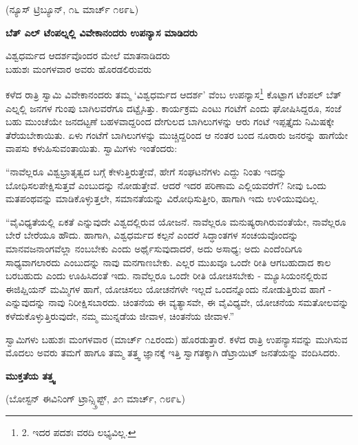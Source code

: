 \begin{center}
(ನ್ಯೂಸ್ ಟ್ರಿಬ್ಯೂನ್, ೧೬ ಮಾರ್ಚ್ ೧೮೯೬)
\end{center}

\begin{center}
\textbf{ಬೆತ್ ಎಲ್ ಟೆಂಪಲ್ನಲ್ಲಿ ವಿವೇಕಾನಂದರು ಉಪನ್ಯಾಸ ಮಾಡಿದರು}
\end{center}

\begin{myquote}
ವಿಶ್ವಧರ್ಮದ ಆದರ್ಶವೊಂದರ ಮೇಲೆ ಮಾತನಾಡಿದರು\\ಬಹುಶಃ ಮಂಗಳವಾರ ಅವರು ಹೊರಡಲಿರುವರು
\end{myquote}

ಕಳೆದ ರಾತ್ರಿ ಸ್ವಾಮಿ ವಿವೇಕಾನಂದರು ತಮ್ಮ ‘ವಿಶ್ವಧರ್ಮದ ಆದರ್ಶ’ ವೆಂಬ ಉಪನ್ಯಾಸ\footnote{2. ಇದರ ಪದಶಃ ವರದಿ ಲಭ್ಯವಿಲ್ಲ.} ಕೊಟ್ಟಾಗ ಟೆಂಪಲ್ ಬೆತ್ ಎಲ್ನಲ್ಲಿ ಜನಗಳ ಗುಂಪು ಬಾಗಿಲವರೆಗೂ ದಟ್ಟೈಸಿತ್ತು. ಕಾರ್ಯಕ್ರಮ ಎಂಟು ಗಂಟೆಗೆ ಎಂದು ಘೋಷಿಸಿದ್ದರೂ, ಸಂಜೆ ಬಹು ಮುಂಚೆಯೇ ಜನದಟ್ಟಣೆ ಬಹಳವಾದ್ದರಿಂದ ದೇಗುಲದ ಬಾಗಿಲುಗಳನ್ನು ಆರು ಗಂಟೆ ಇಪ್ಪತ್ತೈದು ನಿಮಿಷಕ್ಕೇ ತೆರೆಯಬೇಕಾಯಿತು. ಏಳು ಗಂಟೆಗೆ ಬಾಗಿಲುಗಳನ್ನು ಮುಚ್ಚಿದ್ದರಿಂದ ಆ ನಂತರ ಬಂದ ನೂರಾರು ಜನರನ್ನು ಹಾಗೆಯೇ ವಾಪಸು ಕಳುಹಿಸುವಂತಾಯಿತು. ಸ್ವಾಮಿಗಳು ಇಂತೆಂದರು:

“ನಾವೆಲ್ಲರೂ ವಿಶ್ವಭ್ರಾತೃತ್ವದ ಬಗ್ಗೆ ಕೇಳುತ್ತಿರುತ್ತೇವೆ, ಹೇಗೆ ಸಂಘಟನೆಗಳು ಎದ್ದು ನಿಂತು ಇದನ್ನು ಬೋಧಿಸಲಪೇಕ್ಷಿಸುತ್ತವೆ ಎಂಬುದನ್ನು ನೋಡುತ್ತೇವೆ. ಆದರೆ ಇದರ ಪರಿಣಾಮ ಎಲ್ಲಿಯವರೆಗೆ? ನೀವು ಒಂದು ಮತಪಂಥವನ್ನು ಮಾಡಿಕೊಳ್ಳುತ್ತಲೇ, ಸಮಾನತೆಯನ್ನು ವಿರೋಧಿಸುತ್ತೀರಿ, ಹಾಗಾಗಿ ಇದು ಉಳಿಯುವುದಿಲ್ಲ.

“ವೈವಿಧ್ಯತೆಯಲ್ಲಿ ಏಕತೆ ಎನ್ನುವುದೇ ವಿಶ್ವದಲ್ಲಿರುವ ಯೋಜನೆ. ನಾವೆಲ್ಲರೂ ಮನುಷ್ಯರಾಗಿರುವಂತೆಯೇ, ನಾವೆಲ್ಲರೂ ಬೇರೆ ಬೇರೆಯೂ ಹೌದು. ಹಾಗಾಗಿ, ವಿಶ್ವಧರ್ಮದ ಕಲ್ಪನೆ ಎಂದರೆ ಸಿದ್ಧಾಂತಗಳ ಸಂಚಯವೊಂದನ್ನು ಮಾನವಜನಾಂಗವೆಲ್ಲಾ ನಂಬಬೇಕು ಎಂದು ಅರ್ಥೈಸುವುದಾದರೆ, ಅದು ಅಸಾಧ್ಯ; ಅದು ಎಂದೆಂದಿಗೂ ಸಾಧ್ಯವಾಗಲಾರದು ಎಂಬುದನ್ನು ನಾವು ಮನಗಾಣಬೇಕು. ಎಲ್ಲರ ಮುಖವೂ ಒಂದೇ ರೀತಿ ಆಗಬಹುದಾದ ಕಾಲ ಬರಬಹುದು ಎಂದು ಊಹಿಸಿದಂತೆ ಇದು. ನಾವೆಲ್ಲರೂ ಒಂದೇ ರೀತಿ ಯೋಚಿಸಬೇಕು - ಮ್ಯೂಸಿಯಂನಲ್ಲಿರುವ ಈಜಿಪ್ಷಿಯನ್ ಮಮ್ಮಿಗಳ ಹಾಗೆ, ಯೋಚಿಸಲು ಯೋಚನೆಗಳೇ ಇಲ್ಲದೆ ಒಂದನ್ನೊಂದು ನೋಡುತ್ತಿರುವ ಹಾಗೆ - ಎನ್ನುವುದನ್ನು ನಾವು ನಿರೀಕ್ಷಿಸಬಾರದು. ಚಿಂತನೆಯ ಈ ವ್ಯತ್ಯಾಸವೇ, ಈ ವೈವಿಧ್ಯವೇ, ಯೋಚನೆಯ ಸಮತೋಲವನ್ನು ಕಳೆದುಕೊಳ್ಳುತ್ತಿರುವುದೇ, ನಮ್ಮ ಮುನ್ನಡೆಯ ಜೀವಾಳ, ಚಿಂತನೆಯ ಜೀವಾಳ.”

ಸ್ವಾಮಿಗಳು ಬಹುಶಃ ಮಂಗಳವಾರ (ಮಾರ್ಚ್ ೧೭ರಂದು) ಹೊರಡುತ್ತಾರೆ. ಕಳೆದ ರಾತ್ರಿ ಉಪನ್ಯಾಸವನ್ನು ಮುಗಿಸುವ ಮೊದಲು ಅವರು ತಮಗೆ ಹಾಗೂ ತಮ್ಮ ತತ್ತ್ವ ಜ್ಞಾನಕ್ಕೆ ಇತ್ತಿ ಸ್ವಾಗತಕ್ಕಾಗಿ ಡೆಟ್ರಾಯಿಟ್ ಜನತೆಯನ್ನು ವಂದಿಸಿದರು.

\begin{center}
\textbf{ಮುಕ್ತತೆಯ ತತ್ತ್ವ}
\end{center}

\begin{center}
(ಬೋಸ್ಟನ್ ಈವಿನಿಂಗ್ ಟ್ರಾನ್ಸ್ಕ್ರಿಪ್ಟ್, ೨೧ ಮಾರ್ಚ್, ೧೮೯೬)
\end{center}

